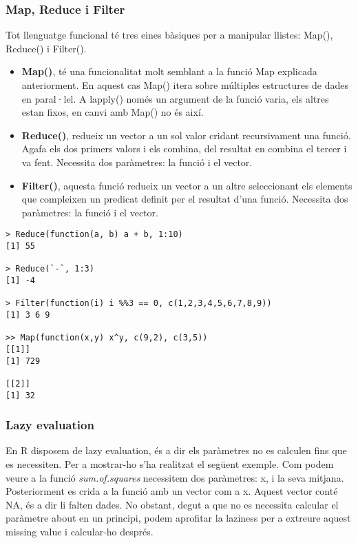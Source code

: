 \documentclass[12pt]{article}
\begin{document}
\medskip
\subsubsection{Map, Reduce i Filter}
Tot llenguatge funcional té tres eines bàsiques per a manipular llistes: Map(), Reduce() i Filter().
\begin{itemize}
\item \textbf{Map()}, té una funcionalitat molt semblant a la funció Map explicada anteriorment. En aquest cas Map() itera sobre múltiples estructures de dades en paral·lel. A lapply() només un argument de la funció varia, els altres estan fixos, en canvi amb Map() no és així. 

\item \textbf{Reduce()}, redueix un vector a un sol valor cridant recursivament una funció. Agafa els dos primers valors i els combina, del resultat en combina el tercer i va fent. Necessita dos paràmetres: la funció i el vector.

\item \textbf{Filter()}, aquesta funció redueix un vector a un altre seleccionant els elements que compleixen un predicat definit per el resultat d'una funció. Necessita dos paràmetres: la funció i el vector. 

\end{itemize} 
\begin{verbatim}
> Reduce(function(a, b) a + b, 1:10)
[1] 55

> Reduce(`-`, 1:3)
[1] -4

> Filter(function(i) i %%3 == 0, c(1,2,3,4,5,6,7,8,9))
[1] 3 6 9

>> Map(function(x,y) x^y, c(9,2), c(3,5))
[[1]]
[1] 729

[[2]]
[1] 32

\end{verbatim}

\medskip
\subsubsection{Lazy evaluation} 
En R disposem de lazy evaluation, és a dir els paràmetres no es calculen fins que es necessiten. Per a mostrar-ho s'ha realitzat el següent exemple. Com podem veure a la funció \textit{sum.of.squares} necessitem dos paràmetres: x, i la seva mitjana. Posteriorment es crida a la funció amb un vector com a x. Aquest vector conté NA, és a dir li falten dades. No obstant, degut a que no es necessita calcular el paràmetre about en un principi, podem aprofitar la laziness per a extreure aquest missing value i calcular-ho després. 
\end{document}
